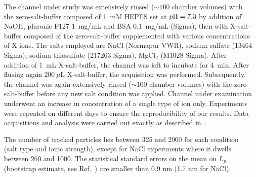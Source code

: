\documentclass[aps,pre,twocolumn]{revtex4}
\begin{document}
The channel under study was extensively rinsed ($\sim100$ chamber volumes) with the zero-salt-buffer composed of 1~mM HEPES set at $p{\rm H}=7.3$ by addition of NaOH, pluronic F127 1~mg/mL and BSA 0.1~mg/mL (Sigma),  then with X-salt-buffer composed of the zero-salt-buffer supplemented with various concentrations of X ions. The salts employed are NaCl (Normapur VWR), sodium sulfate (13464 Sigma), sodium thiosulfate (217263 Sigma), MgCl$_2$ (M1028 Sigma). After addition of 1~mL X-salt-buffer, the channel was left to incubate for 4~min. After flusing again $200~\mu$L  X-salt-buffer, the acquisition was performed. Subsequently, the channel was again extensively rinsed ($\sim100$ chamber volumes) with the zero-salt-buffer before any new salt condition was applied. Channel under examination underwent an increase in concentration of a single type of ion only. Experiments were repeated on different days to ensure the reproducibility of our results. Data acquisitions and analysis were carried out exactly as described in~\cite{Macromolecules}. 

The number of tracked particles lies between 325 and 2000 for each condition (salt type and ionic strength), except for NaCl experiments where it dwells between 260 and 1000. The statistical standard errors on the mean on $L_p$ (bootstrap estimate, see Ref.~\cite{Macromolecules}) are smaller than 0.9 nm (1.7 nm for NaCl). 
\end{document}
